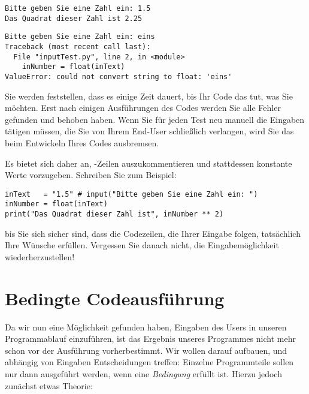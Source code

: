 \begin{cmdbox}
\begin{verbatim}
Bitte geben Sie eine Zahl ein: 1.5
Das Quadrat dieser Zahl ist 2.25
\end{verbatim}
\end{cmdbox}


\begin{cmdbox}
\begin{verbatim}
Bitte geben Sie eine Zahl ein: eins
Traceback (most recent call last):
  File "inputTest.py", line 2, in <module>
    inNumber = float(inText)
ValueError: could not convert string to float: 'eins'
\end{verbatim}
\end{cmdbox}

\begin{hintbox}
Sie werden feststellen, dass es einige Zeit dauert, bis Ihr Code das tut, was Sie möchten. Erst nach einigen Ausführungen des Codes werden Sie alle Fehler gefunden und behoben haben. Wenn Sie für jeden Test neu manuell die Eingaben tätigen müssen, die Sie von Ihrem End-User schließlich verlangen, wird Sie das beim Entwickeln Ihres Codes ausbremsen.

Es bietet sich daher an, -Zeilen auszukommentieren und stattdessen konstante Werte vorzugeben. Schreiben Sie zum Beispiel:
\begin{codebox}
\begin{verbatim}
inText   = "1.5" # input("Bitte geben Sie eine Zahl ein: ")
inNumber = float(inText)
print("Das Quadrat dieser Zahl ist", inNumber ** 2)
\end{verbatim}
\end{codebox}
bis Sie sich sicher sind, dass die Codezeilen, die Ihrer Eingabe folgen, tatsächlich Ihre Wünsche erfüllen. Vergessen Sie danach nicht, die Eingabemöglichkeit wiederherzustellen!
\end{hintbox}

\section{Bedingte Codeausführung}
Da wir nun eine Möglichkeit gefunden haben, Eingaben des Users in unseren Programmablauf einzuführen, ist das Ergebnis unseres Programmes nicht mehr schon vor der Ausführung vorherbestimmt. Wir wollen darauf aufbauen, und abhängig von Eingaben Entscheidungen treffen: Einzelne Programmteile sollen nur dann ausgeführt werden, wenn eine \emph{Bedingung} erfüllt ist. Hierzu jedoch zunächst etwas Theorie:

